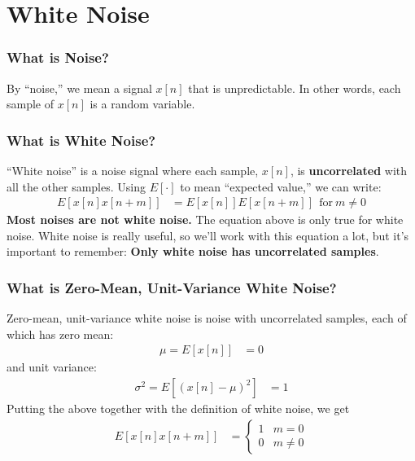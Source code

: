 \documentclass{beamer}
\begin{document}
\section[White Noise]{White Noise}
\setcounter{subsection}{1}

\begin{frame}
  \frametitle{What is Noise?}

  By ``noise,'' we mean a signal $x[n]$ that is unpredictable.  In
  other words, each sample of $x[n]$ is a random variable.
\end{frame}

\begin{frame}
  \frametitle{What is White Noise?}

  ``White noise'' is a noise signal where each sample, $x[n]$, is
  {\bf uncorrelated} with all the other samples.   Using $E[\cdot]$
  to mean ``expected value,'' we can write:
  \begin{align*}
    E\left[x[n]x[n+m]\right] &= E\left[x[n]\right]E\left[x[n+m]\right]~~\mbox{for}~m\ne 0
  \end{align*}
      {\bf Most noises are not white noise.}  The equation above is
      only true for white noise.  White noise is really useful, so
      we'll work with this equation a lot, but it's important to
      remember:
      {\bf Only white noise has uncorrelated samples}.
\end{frame}

\begin{frame}
  \frametitle{What is Zero-Mean, Unit-Variance White Noise?}

  Zero-mean, unit-variance white noise is noise with uncorrelated samples,
  each of which has zero mean:
  \begin{align*}
    \mu = E\left[x[n]\right] & = 0
  \end{align*}
  and unit variance:
  \begin{align*}
    \sigma^2 = E\left[\left(x[n]-\mu\right)^2\right] &= 1
  \end{align*}
  Putting the above together with the definition of white noise, we get
  \begin{align*}
    E\left[x[n]x[n+m]\right] &= \begin{cases}
      1 & m=0\\ 0 &m\ne 0\end{cases}
  \end{align*}
\end{frame}
\end{document}

